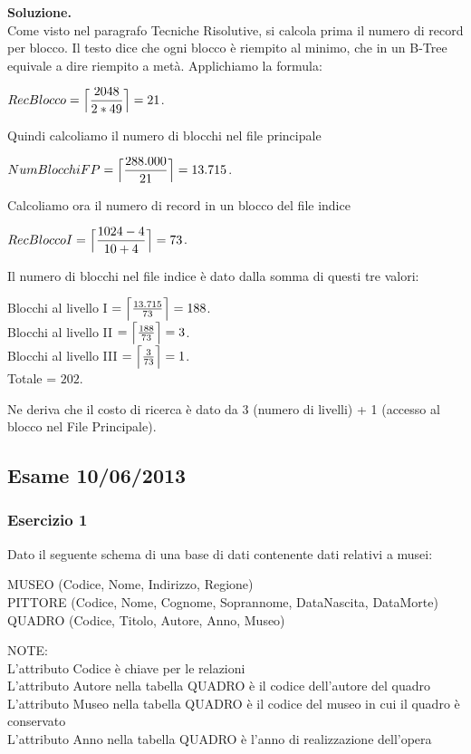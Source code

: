 \noindent\textbf{\fontsize{14pt}{1em}Soluzione.}\\
Come visto nel paragrafo Tecniche Risolutive, si calcola prima il numero di record per blocco. Il testo dice che 
ogni blocco è riempito al minimo, che in un B-Tree equivale a dire riempito a metà. Applichiamo la formula:
\begin{center}
 $RecBlocco = \Bigl\lceil \dfrac{2048}{2*49} \Bigr\rceil = 21$.\\
\end{center}
Quindi calcoliamo il numero di blocchi nel file principale
\begin{center}
 $NumBlocchiFP = \Bigl\lceil \dfrac{288.000}{21} \Bigr\rceil = 13.715$.\\
\end{center}
Calcoliamo ora il numero di record in un blocco del file indice
\begin{center}
 $RecBloccoI = \Bigl\lceil \dfrac{1024-4}{10+4} \Bigr\rceil = 73$.\\
\end{center}
Il numero di blocchi nel file indice è dato dalla somma di questi tre valori:
\begin{center}
 Blocchi al livello I $= \Bigl\lceil \frac{13.715}{73} \Bigr\rceil = 188$.\\
 
 Blocchi al livello II $= \Bigl\lceil \frac{188}{73} \Bigr\rceil = 3$.\\
 
 Blocchi al livello III $= \Bigl\lceil \frac{3}{73} \Bigr\rceil = 1$.\\
 Totale = $202$.
\end{center}
Ne deriva che il costo di ricerca è dato da 3 (numero di livelli) + 1 (accesso al blocco nel File Principale).

\subsection{Esame 10/06/2013}
  \subsubsection{Esercizio 1}
  Dato il seguente schema di una base di dati contenente dati relativi a musei:
  \begin{center}
  MUSEO (Codice, Nome, Indirizzo, Regione)\\
  PITTORE (Codice, Nome, Cognome, Soprannome, DataNascita, DataMorte)\\
  QUADRO (Codice, Titolo, Autore, Anno, Museo)\\
  \end{center}
  NOTE:\\
  L'attributo Codice è chiave per le relazioni\\
  L'attributo Autore nella tabella QUADRO è il codice dell'autore del quadro\\
  L'attributo Museo nella tabella QUADRO è il codice del museo in cui il quadro è conservato\\
  L'attributo Anno nella tabella QUADRO è l'anno di realizzazione dell'opera\\

